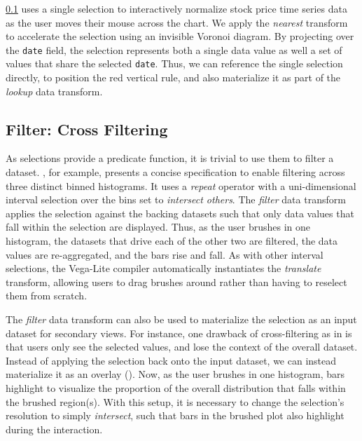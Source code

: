 \cref{} uses a single selection to interactively normalize
stock price time series data as the user moves their mouse across the chart. We
apply the \emph{nearest} transform to accelerate the selection using an
invisible Voronoi diagram. By projecting over the \texttt{date} field, the
selection represents both a single data value as well a set of values that share
the selected \texttt{date}. Thus, we can reference the single selection
directly, to position the red vertical rule, and also materialize it as part of
the \emph{lookup} data transform.

\subsection{Filter: Cross Filtering}

As selections provide a predicate function, it is trivial to use them to filter
a dataset. , for example, presents a concise
specification to enable filtering across three distinct binned histograms. It
uses a \emph{repeat} operator with a uni-dimensional interval selection over the
bins set to \emph{intersect others}. The \emph{filter} data transform applies
the selection against the backing datasets such that only data values that fall
within the selection are displayed. Thus, as the user brushes in one histogram,
the datasets that drive each of the other two are filtered, the data values are
re-aggregated, and the bars rise and fall. As with other interval selections,
the Vega-Lite compiler automatically instantiates the \emph{translate}
transform, allowing users to drag brushes around rather than having to reselect
them from scratch.

The \emph{filter} data transform can also be used to materialize the selection
as an input dataset for secondary views. For instance, one drawback of
cross-filtering as in  is that users only see the
selected values, and lose the context of the overall dataset. Instead of
applying the selection back onto the input dataset, we can instead materialize
it as an overlay (). Now, as the user brushes in one
histogram, bars highlight to visualize the proportion of the overall
distribution that falls within the brushed region(s). With this setup, it is
necessary to change the selection's resolution to simply \emph{intersect}, such
that bars in the brushed plot also highlight during the interaction.